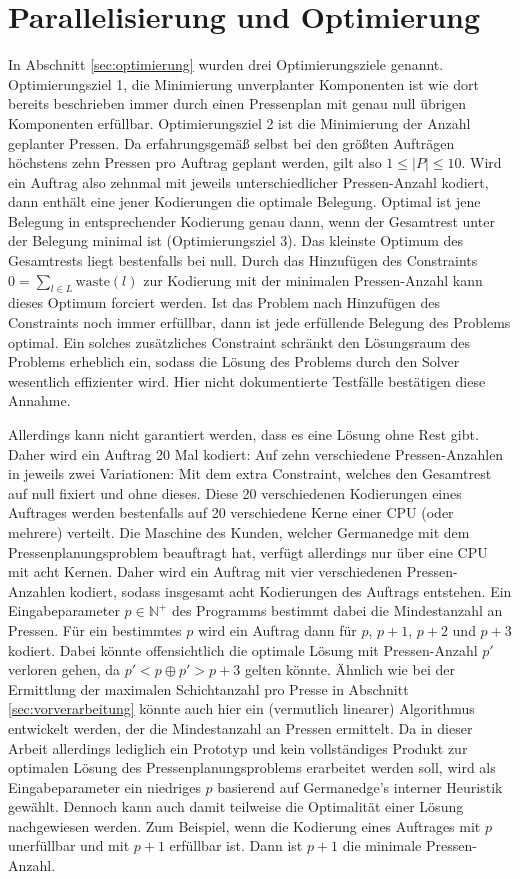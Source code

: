 \section{Parallelisierung und Optimierung}
In Abschnitt \ref{sec:optimierung} wurden drei Optimierungsziele genannt.
Optimierungsziel 1, die Minimierung unverplanter Komponenten ist wie dort bereits beschrieben immer durch einen Pressenplan mit genau null übrigen Komponenten erfüllbar.
Optimierungsziel 2 ist die Minimierung der Anzahl geplanter Pressen.
Da erfahrungsgemäß selbst bei den größten Aufträgen höchstens zehn Pressen pro Auftrag geplant werden, gilt also $1 \leq \lvert P \rvert \leq 10$.
Wird ein Auftrag also zehnmal mit jeweils unterschiedlicher Pressen-Anzahl kodiert, dann enthält eine jener Kodierungen die optimale Belegung.
Optimal ist jene Belegung in entsprechender Kodierung genau dann, wenn der Gesamtrest unter der Belegung minimal ist (Optimierungsziel 3).
Das kleinste Optimum des Gesamtrests liegt bestenfalls bei null.
Durch das Hinzufügen des Constraints $0 = \sum_{l \in L} \text{waste}(l)$ zur Kodierung mit der minimalen Pressen-Anzahl
kann dieses Optimum forciert werden.
Ist das Problem nach Hinzufügen des Constraints noch immer erfüllbar, dann ist jede erfüllende Belegung des Problems optimal.
Ein solches zusätzliches Constraint schränkt den Lösungsraum des Problems erheblich ein, sodass die Lösung des Problems durch den Solver wesentlich effizienter wird.
Hier nicht dokumentierte Testfälle bestätigen diese Annahme.

Allerdings kann nicht garantiert werden, dass es eine Lösung ohne Rest gibt.
Daher wird ein Auftrag 20 Mal kodiert: Auf zehn verschiedene Pressen-Anzahlen in jeweils zwei Variationen:
Mit dem extra Constraint, welches den Gesamtrest auf null fixiert und ohne dieses.
Diese 20 verschiedenen Kodierungen eines Auftrages werden bestenfalls auf 20 verschiedene Kerne einer CPU (oder mehrere) verteilt.
Die Maschine des Kunden, welcher Germanedge mit dem Pressenplanungsproblem beauftragt hat, verfügt allerdings nur über eine CPU mit acht Kernen.
Daher wird ein Auftrag mit vier verschiedenen Pressen-Anzahlen kodiert, sodass insgesamt acht Kodierungen des Auftrags entstehen.
Ein Eingabeparameter $p \in \mathbb{N}^+$ des Programms bestimmt dabei die Mindestanzahl an Pressen.
Für ein bestimmtes $p$ wird ein Auftrag dann für $p$, $p+1$, $p+2$ und $p+3$ kodiert.
Dabei könnte offensichtlich die optimale Lösung mit Pressen-Anzahl $p\prime$ verloren gehen, da $p\prime < p \oplus p\prime > p + 3$ gelten könnte.
Ähnlich wie bei der Ermittlung der maximalen Schichtanzahl pro Presse in Abschnitt \ref{sec:vorverarbeitung} könnte auch hier ein
(vermutlich linearer) Algorithmus entwickelt werden, der die Mindestanzahl an Pressen ermittelt.
Da in dieser Arbeit allerdings lediglich ein Prototyp und kein vollständiges Produkt zur optimalen Lösung des Pressenplanungsproblems erarbeitet werden soll,
wird als Eingabeparameter ein niedriges $p$ basierend auf Germanedge's interner Heuristik gewählt.
Dennoch kann auch damit teilweise die Optimalität einer Lösung nachgewiesen werden.
Zum Beispiel, wenn die Kodierung eines Auftrages mit $p$ unerfüllbar und mit $p+1$ erfüllbar ist.
Dann ist $p+1$ die minimale Pressen-Anzahl.


